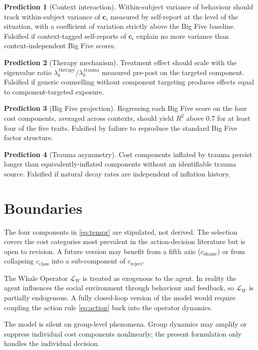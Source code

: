 \documentclass[12pt,a4paper]{article}
\begin{document}
\textbf{Prediction 1} (Context interaction). Within-subject variance of behaviour should track within-subject variance of $\mathbf{c}_i$ measured by self-report at the level of the situation, with a coefficient of variation strictly above the Big Five baseline. Falsified if context-tagged self-reports of $\mathbf{c}_i$ explain no more variance than context-independent Big Five scores.

\textbf{Prediction 2} (Therapy mechanism). Treatment effect should scale with the eigenvalue ratio $\lambda_k^{\,\mathrm{therapy}} / \lambda_k^{\,\mathrm{trauma}}$ measured pre-post on the targeted component. Falsified if generic counselling without component targeting produces effects equal to component-targeted exposure.

\textbf{Prediction 3} (Big Five projection). Regressing each Big Five score on the four cost components, averaged across contexts, should yield $R^2$ above $0.7$ for at least four of the five traits. Falsified by failure to reproduce the standard Big Five factor structure.

\textbf{Prediction 4} (Trauma asymmetry). Cost components inflated by trauma persist longer than equivalently-inflated components without an identifiable trauma source. Falsified if natural decay rates are independent of inflation history.

\section{Boundaries}
\label{sec:boundaries}

The four components in \eqref{eq:tensor} are stipulated, not derived. The selection covers the cost categories most prevalent in the action-decision literature but is open to revision. A future version may benefit from a fifth axis ($c_{\mathrm{shame}}$) or from collapsing $c_{\mathrm{class}}$ into a sub-component of $c_{\mathrm{reject}}$.

The Whale Operator $\mathcal{L}_W$ is treated as exogenous to the agent. In reality the agent influences the social environment through behaviour and feedback, so $\mathcal{L}_W$ is partially endogenous. A fully closed-loop version of the model would require coupling the action rule \eqref{eq:action} back into the operator dynamics.

The model is silent on group-level phenomena. Group dynamics may amplify or suppress individual cost components nonlinearly; the present formulation only handles the individual decision.
\end{document}
